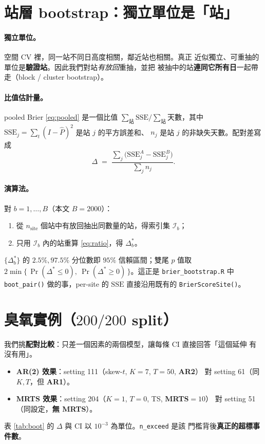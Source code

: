 \documentclass[12pt]{article}
\newcommand{\Phat}{\widehat{P}}
\newcommand{\code}[1]{\texttt{#1}}
\begin{document}
\section{站層 bootstrap：獨立單位是「站」}

\paragraph{獨立單位。}空間 CV 裡，同一站不同日高度相關，鄰近站也相關。真正
近似獨立、可重抽的單位是\textbf{驗證站}。因此我們對站\emph{有放回}重抽，並把
被抽中的站\textbf{連同它所有日}一起帶走（block / cluster bootstrap）。

\paragraph{比值估計量。}pooled Brier \eqref{eq:pooled} 是一個比值
$\sum_{\text{站}}\mathrm{SSE}/\sum_{\text{站}}\text{天數}$，其中
$\mathrm{SSE}_j = \sum_{t}(I - \Phat)^2$ 是站 $j$ 的平方誤差和、
$n_j$ 是站 $j$ 的非缺失天數。配對差寫成
\begin{equation}
  \Delta \;=\; \frac{\sum_j \bigl(\mathrm{SSE}^A_j - \mathrm{SSE}^B_j\bigr)}
                     {\sum_j n_j} .
  \label{eq:ratio}
\end{equation}

\paragraph{演算法。}對 $b = 1,\dots,B$（本文 $B=2000$）：
\begin{enumerate}
  \item 從 $n_{\mathrm{site}}$ 個站中有放回抽出同數量的站，得索引集 $\mathcal{I}_b$；
  \item 只用 $\mathcal{I}_b$ 內的站重算 \eqref{eq:ratio}，得 $\Delta^{*}_b$。
\end{enumerate}
$\{\Delta^*_b\}$ 的 $2.5\%,97.5\%$ 分位數即 $95\%$ 信賴區間；雙尾 $p$ 值取
$2\min\{\,\Pr(\Delta^*\le 0),\ \Pr(\Delta^*\ge 0)\,\}$。這正是
\code{brier\_bootstrap.R} 中 \code{boot\_pair()} 做的事，per-site 的 $\mathrm{SSE}$
直接沿用既有的 \code{BrierScoreSite()}。

\section{臭氧實例（$200/200$ split）}

我們挑\textbf{配對比較}：只差一個因素的兩個模型，讓每條 CI 直接回答「這個延伸
有沒有用」。
\begin{itemize}
  \item \textbf{AR(2) 效果}：setting 111（skew-$t$, $K{=}7$, $T{=}50$, \textbf{AR2}）
        對 setting 61（同 $K,T$，但 \textbf{AR1}）。
  \item \textbf{MRTS 效果}：setting 204（$K{=}1$, $T{=}0$, TS, \textbf{MRTS}$=10$）
        對 setting 51（同設定，\textbf{無 MRTS}）。
\end{itemize}
表 \ref{tab:boot} 的 $\Delta$ 與 CI 以 $10^{-3}$ 為單位。\code{n\_exceed} 是該
門檻背後\textbf{真正的超標事件數}。
\end{document}
